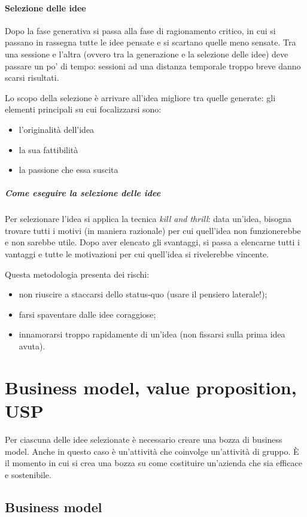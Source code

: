 \paragraph*{Selezione delle idee} Dopo la fase generativa si passa alla fase di
ragionamento critico, in cui si passano in rassegna tutte le idee pensate e si
scartano quelle meno sensate. Tra una sessione e l'altra (ovvero tra la
generazione e la selezione delle idee) deve passare un po' di tempo: sessioni
ad una distanza temporale troppo breve danno scarsi risultati.

Lo scopo della selezione è arrivare all'idea migliore tra quelle generate: gli
elementi principali su cui focalizzarsi sono:
\begin{itemize}
 \item l'originalità dell'idea
 \item la sua fattibilità
 \item la passione che essa suscita
\end{itemize}

\subparagraph*{Come eseguire la selezione delle idee} Per selezionare l'idea si
applica la tecnica \textit{kill and thrill}: data un'idea, bisogna trovare
tutti i motivi (in maniera razionale) per cui quell'idea non funzionerebbe e
non sarebbe utile. Dopo aver elencato gli svantaggi, si passa a elencarne tutti
i vantaggi e tutte le motivazioni per cui quell'idea si rivelerebbe vincente.

\noindent Questa metodologia presenta dei rischi:
\begin{itemize}
 \item non riuscire a staccarsi dello status-quo (usare il pensiero laterale!);
 \item farsi spaventare dalle idee coraggiose;
 \item innamorarsi troppo rapidamente di un'idea (non fissarsi sulla prima idea
avuta).
\end{itemize}

\section{Business model, value proposition, USP}

Per ciascuna delle idee selezionate è necessario creare una bozza di business
model. Anche in questo caso è un'attività che coinvolge un'attività di gruppo. È
il momento in cui si crea una bozza su come costituire un'azienda che sia
efficace e sostenibile.

\subsection{Business model}

